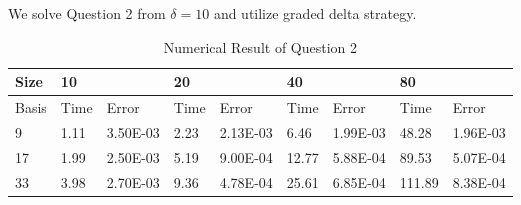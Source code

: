 \documentclass{article}
\begin{document}
We solve Question 2 from $\delta = 10$ and utilize graded delta strategy.
\begin{table}[H]
		\centering
	\caption{Numerical Result of Question 2}
	\begin{tabular}{|l|l|l|l|l|l|l|l|l|}
		\hline
		{\color[HTML]{000000} Size}  & \multicolumn{2}{l|}{{\color[HTML]{000000} 10}}                & \multicolumn{2}{l|}{{\color[HTML]{000000} 20}}                & \multicolumn{2}{l|}{{\color[HTML]{000000} 40}}                 & \multicolumn{2}{l|}{{\color[HTML]{000000} 80}}                  \\ \hline
		{\color[HTML]{000000} Basis} & {\color[HTML]{000000} Time} & {\color[HTML]{000000} Error}    & {\color[HTML]{000000} Time} & {\color[HTML]{000000} Error}    & {\color[HTML]{000000} Time}  & {\color[HTML]{000000} Error}    & {\color[HTML]{000000} Time}   & {\color[HTML]{000000} Error}    \\ \hline
		{\color[HTML]{000000} 9}     & {\color[HTML]{000000} 1.11} & {\color[HTML]{000000} 3.50E-03} & {\color[HTML]{000000} 2.23} & {\color[HTML]{000000} 2.13E-03} & {\color[HTML]{000000} 6.46}  & {\color[HTML]{000000} 1.99E-03} & {\color[HTML]{000000} 48.28}  & {\color[HTML]{000000} 1.96E-03} \\ \hline
		{\color[HTML]{000000} 17}    & {\color[HTML]{000000} 1.99} & {\color[HTML]{000000} 2.50E-03} & {\color[HTML]{000000} 5.19} & {\color[HTML]{000000} 9.00E-04} & {\color[HTML]{000000} 12.77} & {\color[HTML]{000000} 5.88E-04} & {\color[HTML]{000000} 89.53}  & {\color[HTML]{000000} 5.07E-04} \\ \hline
		{\color[HTML]{000000} 33}    & {\color[HTML]{000000} 3.98} & {\color[HTML]{000000} 2.70E-03} & {\color[HTML]{000000} 9.36} & {\color[HTML]{000000} 4.78E-04} & {\color[HTML]{000000} 25.61} & {\color[HTML]{000000} 6.85E-04} & {\color[HTML]{000000} 111.89} & {\color[HTML]{000000} 8.38E-04} \\ \hline
	\end{tabular}
\end{table}
\end{document}
